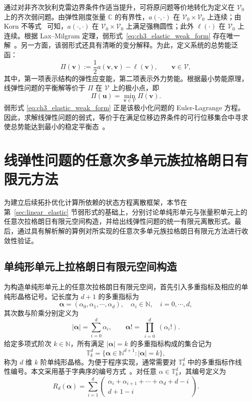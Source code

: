 通过对非齐次狄利克雷边界条件作适当提升，可将原问题等价地转化为定义在 $\mathcal{V}_0$ 上的齐次弱问题。由弹性刚度张量 $\mathbb{C}$ 的有界性，$a(\cdot,\cdot)$ 在 $\mathcal{V}_0\times\mathcal{V}_0$ 上连续；由 Korn 不等式~\cite{brennerMathematicalTheoryFinite2008} 可知，$a(\cdot,\cdot)$ 在 $\mathcal{V}_0\times\mathcal{V}_0$ 上满足强椭圆性；此外 $\ell(\cdot)$ 在 $\mathcal{V}_0$ 上连续。根据 Lax–Milgram 定理，弱形式~\eqref{eq:ch3_elastic_weak_form} 存在唯一解~\cite{ciarletFiniteElementMethod2002a}。另一方面，该弱形式还具有清晰的变分解释。为此，定义系统的总势能泛函：
\[
\Pi(\boldsymbol{v}) :=\frac{1}{2}a(\boldsymbol{v},\boldsymbol{v})-\ell(\boldsymbol{v}), \qquad \boldsymbol{v}\in\mathcal{V},
\]
其中，第一项表示结构的弹性应变能，第二项表示外力势能。根据最小势能原理，线弹性问题的平衡解等价于 $\Pi$ 在 $\mathcal{V}$ 上的极小点，即
\[
\Pi(\boldsymbol{u})=\min_{\boldsymbol{v}\in\mathcal{V}}\Pi(\boldsymbol{v}).
\]
弱形式 \eqref{eq:ch3_elastic_weak_form} 正是该极小化问题的 Euler-Lagrange 方程。因此，求解线弹性问题的弱式，等价于在满足位移边界条件的可行位移集合中寻求使总势能达到最小的稳定平衡态~\cite{zienkiewiczFiniteElementMethod2005}。


\section{线弹性问题的任意次多单元族拉格朗日有限元方法}
\label{sec:lagrange_fem}

为建立后续拓扑优化计算所依赖的状态方程离散框架，本节在第~\ref{sec:linear_elastic} 节弱形式的基础上，分别讨论单纯形单元与张量积单元上的任意次拉格朗日有限元空间构造，并给出线弹性问题的统一有限元离散形式。最后，通过具有解析解的算例对所实现的任意次多单元族拉格朗日有限元方法进行收敛性验证。


\subsection{单纯形单元上拉格朗日有限元空间构造}
\label{subsec:simplex_lagrange}

为构造单纯形单元上的任意次拉格朗日有限元空间，首先引入多重指标及相应的单纯形晶格记号。记长度为 $d+1$ 的多重指标为
\[
\boldsymbol{\alpha} = (\alpha_0,\alpha_1,\cdots,\alpha_d),\quad\alpha_i\in\mathbb{N},\quad{i}=0,\cdots,d,
\]
其次数与阶乘分别定义为
\[|\boldsymbol{\alpha}| = \sum_{i=0}^{d}\alpha_i,\qquad\boldsymbol{\alpha}! = \prod_{\substack{i=0}}^d(\alpha_i!).
\]
给定多项式阶次 $k\in\mathbb{N}$，所有满足 $|\boldsymbol{\alpha}| = k$ 的多重指标构成的集合记为
\[
\mathbb{T}_k^d = \{\boldsymbol{\alpha}\in\mathbb{N}^{d+1}:|\boldsymbol{\alpha}| = k\},
\]
称为 $d$ 维 $k$ 阶单纯形晶格。为便于程序实现，通常需要对 $\mathbb{T}_k^d$ 中的多重指标作线性编号。本文采用基于字典序的编号方式~\cite{chenGeometricDecompositionEfficient2024b}。对任意 $\alpha\in\mathbb{T}_k^d$，其编号定义为
\[
R_d(\boldsymbol{\alpha}) = \sum_{i=1}^d
\begin{pmatrix}
	\alpha_i+\alpha_{i+1}+\cdots+\alpha_d+d-i\\
	d+1-i
\end{pmatrix}.
\]

